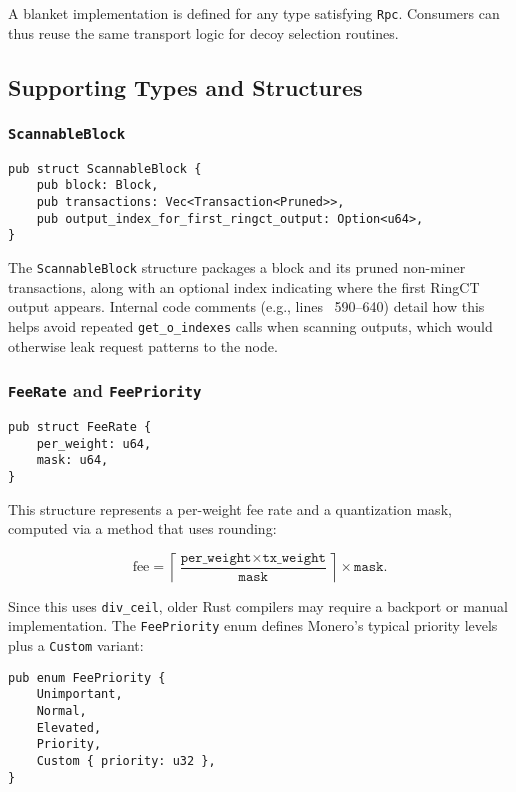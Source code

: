 \documentclass[12pt,a4paper]{article}
\begin{document}
A blanket implementation is defined for any type satisfying \texttt{Rpc}. Consumers can thus reuse
the same transport logic for decoy selection routines.

\subsection{Supporting Types and Structures}
\label{sec:monero-rpc-supporting-types}

\subsubsection{\texttt{ScannableBlock}}
\label{sec:monero-rpc-supporting-types-scannableblock}

\begin{verbatim}
pub struct ScannableBlock {
    pub block: Block,
    pub transactions: Vec<Transaction<Pruned>>,
    pub output_index_for_first_ringct_output: Option<u64>,
}
\end{verbatim}

The \texttt{ScannableBlock} structure packages a block and its pruned non-miner transactions, along
with an optional index indicating where the first RingCT output appears. Internal code comments
(e.g., lines ~590–640) detail how this helps avoid repeated \texttt{get\_o\_indexes} calls when
scanning outputs, which would otherwise leak request patterns to the node.

\subsubsection{\texttt{FeeRate} and \texttt{FeePriority}}
\label{sec:monero-rpc-supporting-types-fee}

\begin{verbatim}
pub struct FeeRate {
    per_weight: u64,
    mask: u64,
}
\end{verbatim}

This structure represents a per-weight fee rate and a quantization mask, computed via a method that
uses rounding:

\[
\text{fee} = \left\lceil \frac{\texttt{per\_weight} \times \texttt{tx\_weight}}{\texttt{mask}} \right\rceil \times \texttt{mask}.
\]

Since this uses \texttt{div\_ceil}, older Rust compilers may require a backport or manual
implementation. The \texttt{FeePriority} enum defines Monero’s typical priority levels plus a
\texttt{Custom} variant:

\begin{verbatim}
pub enum FeePriority {
    Unimportant,
    Normal,
    Elevated,
    Priority,
    Custom { priority: u32 },
}
\end{verbatim}
\end{document}
